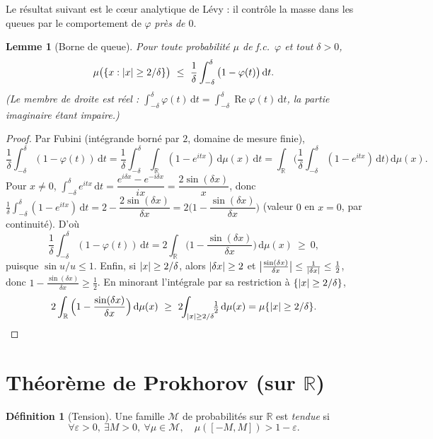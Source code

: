 \documentclass[11pt]{article}
\renewcommand{\Re}{\operatorname{Re}}
\newcommand{\R}{\mathbb{R}}
\newcommand{\dd}{\,\mathrm{d}}
\DeclarePairedDelimiter{\abs}{\lvert}{\rvert}
\theoremstyle{plain}
\newtheorem{lemme}[theoreme]{Lemme}
\theoremstyle{definition}
\newtheorem{definition}[theoreme]{Définition}
\theoremstyle{remark}
\begin{document}
Le résultat suivant est le c\oe ur analytique de Lévy : il contrôle la masse dans les queues par le
comportement de $\varphi$ \emph{près de $0$}.

\begin{lemme}[Borne de queue]\label{lem:tail}
Pour toute probabilité $\mu$ de f.c.\ $\varphi$ et tout $\delta>0$,
\[
\mu\big(\{x:\abs x\ge 2/\delta\}\big)\ \le\ \frac1\delta\int_{-\delta}^{\delta}\big(1-\varphi(t)\big)\dd t.
\]
(Le membre de droite est réel : $\int_{-\delta}^{\delta}\varphi(t)\dd t=\int_{-\delta}^{\delta}\Re\varphi(t)\dd t$,
la partie imaginaire étant impaire.)
\end{lemme}

\begin{proof}
Par Fubini (intégrande borné par $2$, domaine de mesure finie),
\[
\frac1\delta\int_{-\delta}^{\delta}(1-\varphi(t))\dd t
=\frac1\delta\int_{-\delta}^{\delta}\!\!\int_\R(1-e^{itx})\dd\mu(x)\dd t
=\int_\R\Big(\frac1\delta\int_{-\delta}^{\delta}(1-e^{itx})\dd t\Big)\dd\mu(x).
\]
Pour $x\neq0$, $\int_{-\delta}^{\delta}e^{itx}\dd t=\dfrac{e^{i\delta x}-e^{-i\delta x}}{ix}
=\dfrac{2\sin(\delta x)}{x}$, donc
$\frac1\delta\int_{-\delta}^{\delta}(1-e^{itx})\dd t=2-\dfrac{2\sin(\delta x)}{\delta x}
=2\Big(1-\dfrac{\sin(\delta x)}{\delta x}\Big)$ (valeur $0$ en $x=0$, par continuité). D'où
\[
\frac1\delta\int_{-\delta}^{\delta}(1-\varphi(t))\dd t
=2\int_\R\Big(1-\frac{\sin(\delta x)}{\delta x}\Big)\dd\mu(x)\ \ge\ 0,
\]
puisque $\sin u/u\le1$. Enfin, si $\abs x\ge 2/\delta$, alors $\abs{\delta x}\ge2$ et
$\big|\tfrac{\sin(\delta x)}{\delta x}\big|\le\tfrac1{\abs{\delta x}}\le\tfrac12$, donc
$1-\tfrac{\sin(\delta x)}{\delta x}\ge\tfrac12$. En minorant l'intégrale par sa restriction à
$\{\abs x\ge2/\delta\}$,
\[
2\int_\R\Big(1-\frac{\sin(\delta x)}{\delta x}\Big)\dd\mu(x)
\ \ge\ 2\!\!\int_{\abs x\ge2/\delta}\!\!\tfrac12\dd\mu(x)=\mu\{\abs x\ge2/\delta\}.\qedhere
\]
\end{proof}

\section{Théorème de Prokhorov (sur $\R$)}

\begin{definition}[Tension]
Une famille $\mathcal M$ de probabilités sur $\R$ est \emph{tendue} si
\[
\forall\varepsilon>0,\ \exists M>0,\ \forall\mu\in\mathcal M,\quad \mu([-M,M])>1-\varepsilon.
\]
\end{definition}
\end{document}
